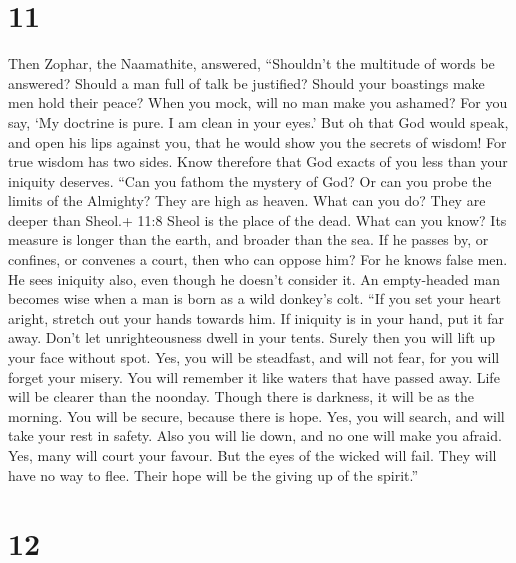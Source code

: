 \hypertarget{section-8}{%
\section{11}\label{section-8}}

 Then Zophar, the Naamathite, answered, 
``Shouldn't the multitude of words be answered? Should a man full of
talk be justified?  Should your boastings make men hold
their peace? When you mock, will no man make you ashamed? 
For you say, `My doctrine is pure. I am clean in your eyes.'
 But oh that God would speak, and open his lips against you,
 that he would show you the secrets of wisdom! For true
wisdom has two sides. Know therefore that God exacts of you less than
your iniquity deserves.  ``Can you fathom the mystery of
God? Or can you probe the limits of the Almighty?  They are
high as heaven. What can you do? They are deeper than Sheol.+ 11:8 Sheol
is the place of the dead. What can you know?  Its measure is
longer than the earth, and broader than the sea.  If he
passes by, or confines, or convenes a court, then who can oppose him?
 For he knows false men. He sees iniquity also, even though
he doesn't consider it.  An empty-headed man becomes wise
when a man is born as a wild donkey's colt.  ``If you set
your heart aright, stretch out your hands towards him.  If
iniquity is in your hand, put it far away. Don't let unrighteousness
dwell in your tents.  Surely then you will lift up your
face without spot. Yes, you will be steadfast, and will not fear,
 for you will forget your misery. You will remember it like
waters that have passed away.  Life will be clearer than
the noonday. Though there is darkness, it will be as the morning.
 You will be secure, because there is hope. Yes, you will
search, and will take your rest in safety.  Also you will
lie down, and no one will make you afraid. Yes, many will court your
favour.  But the eyes of the wicked will fail. They will
have no way to flee. Their hope will be the giving up of the spirit.''

\hypertarget{section-9}{%
\section{12}\label{section-9}}

